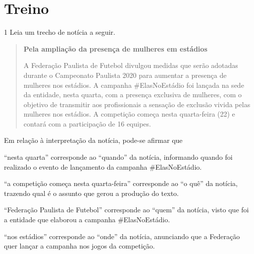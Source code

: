
\section{Treino}

\num{1} Leia um trecho de notícia a seguir.

\begin{quote}
\textbf{Pela ampliação da presença de mulheres em estádios}


A Federação Paulista de Futebol divulgou medidas que serão adotadas
durante o Campeonato Paulista 2020 para aumentar a presença de mulheres
nos estádios. A campanha \#ElasNoEstádio foi lançada na sede da
entidade, nesta quarta, com a presença exclusiva de mulheres, com o
objetivo de transmitir aos profissionais a sensação de exclusão vivida
pelas mulheres nos estádios. A competição começa nesta quarta-feira (22)
e contará com a participação de 16 equipes.

\end{quote}

Em relação à interpretação da notícia, pode-se afirmar que

\begin{escolha}
\item ``nesta quarta'' corresponde ao ``quando'' da notícia, informando
quando foi realizado o evento de lançamento da campanha \#ElasNoEstádio.

\item ``a competição começa nesta quarta-feira'' corresponde ao ``o quê''
da notícia, trazendo qual é o assunto que gerou a produção do texto.

\item ``Federação Paulista de Futebol'' corresponde ao ``quem'' da
notícia, visto que foi a entidade que elaborou a campanha
\#ElasNoEstádio.

\item ``nos estádios'' corresponde ao ``onde'' da notícia, anunciando que
a Federação quer lançar a campanha nos jogos da competição.
\end{escolha}


